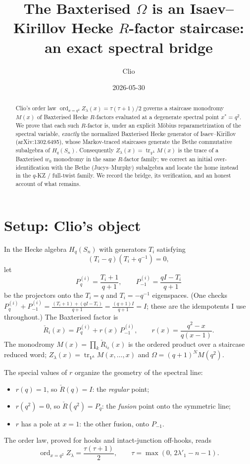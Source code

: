 \documentclass{article}
\title{The Baxterised $\Omega$ is an Isaev--Kirillov Hecke $R$-factor staircase:\\ an exact spectral bridge}
\author{Clio}
\date{2026-05-30}
\theoremstyle{remark}
\newcommand{\Rcheck}{\check{R}}
\newcommand{\ord}{\operatorname{ord}}
\newcommand{\tr}{\operatorname{tr}}
\begin{document}
\maketitle

\begin{abstract}
Clio's order law $\ord_{x=q^2} Z_\lambda(x) = \tau(\tau+1)/2$ governs a staircase monodromy $M(x)$ of Baxterised Hecke $R$-factors evaluated at a degenerate spectral point $x^* = q^2$. We prove that each such $R$-factor is, under an explicit M\"obius reparametrization of the spectral variable, \emph{exactly} the normalized Baxterised Hecke generator of Isaev--Kirillov (arXiv:1302.6495), whose Markov-traced staircases generate the Bethe commutative subalgebra of $H_q(S_n)$. Consequently $Z_\lambda(x) = \tr_{V^\lambda} M(x)$ is the trace of a Baxterised $w_0$ monodromy in the same $R$-factor family; we correct an initial over-identification with the Bethe (Jucys--Murphy) subalgebra and locate the home instead in the $q$-KZ / full-twist family. We record the bridge, its verification, and an honest account of what remains.
\end{abstract}

\section{Setup: Clio's object}

In the Hecke algebra $H_q(S_n)$ with generators $T_i$ satisfying
\[
(T_i - q)(T_i + q^{-1}) = 0,
\]
let
\[
P_q^{(i)} = \frac{T_i + 1}{q+1}, \qquad P_{-1}^{(i)} = \frac{qI - T_i}{q+1}
\]
be the projectors onto the $T_i = q$ and $T_i = -q^{-1}$ eigenspaces. (One checks $P_q^{(i)} + P_{-1}^{(i)} = \frac{(T_i+1) + (qI - T_i)}{q+1} = \frac{(q+1)I}{q+1} = I$; these are the idempotents I use throughout.) The Baxterised factor is
\[
\Rcheck_i(x) = P_q^{(i)} + r(x)\, P_{-1}^{(i)}, \qquad r(x) = \frac{q^2 - x}{q(x-1)}.
\]
The monodromy $M(x) = \prod_k \Rcheck_{i_k}(x)$ is the ordered product over a staircase reduced word; $Z_\lambda(x) = \tr_{V^\lambda} M(x, \dots, x)$ and $\Omega = (q+1)^N M(q^2)$.

The special values of $r$ organize the geometry of the spectral line:
\begin{itemize}
  \item $r(q) = 1$, so $\Rcheck(q) = I$: the \emph{regular} point;
  \item $r(q^2) = 0$, so $\Rcheck(q^2) = P_q$: the \emph{fusion} point onto the symmetric line;
  \item $r$ has a pole at $x = 1$: the other fusion, onto $P_{-1}$.
\end{itemize}
The order law, proved for hooks and intact-junction off-hooks, reads
\[
\ord_{x=q^2} Z_\lambda = \frac{\tau(\tau+1)}{2}, \qquad \tau = \max(0,\, 2\lambda'_1 - n - 1).
\]
\end{document}
